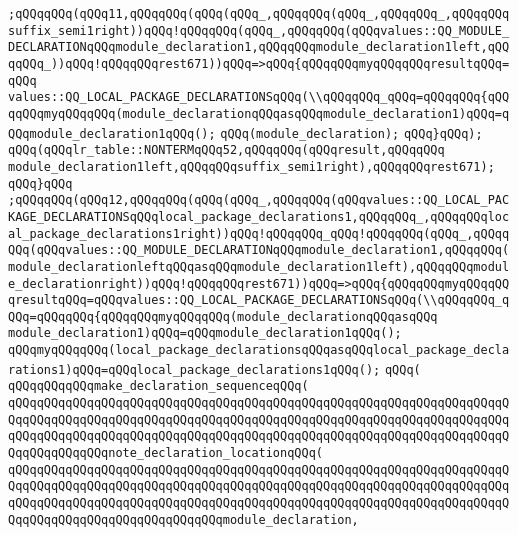 \verb|;qQQqqQQq(qQQq11,qQQqqQQq(qQQq(qQQq_,qQQqqQQq(qQQq_,qQQqqQQq_,qQQqqQQqsuffix_semi1right))qQQq!qQQqqQQq(qQQq_,qQQqqQQq(qQQqvalues::QQ_MODULE_DECLARATIONqQQqmodule_declaration1,qQQqqQQqmodule_declaration1left,qQQqqQQq_))qQQq!qQQqqQQqrest671))qQQq=>qQQq{qQQqqQQqmyqQQqqQQqresultqQQq=qQQq|\newline
\verb|values::QQ_LOCAL_PACKAGE_DECLARATIONSqQQq(\\qQQqqQQq_qQQq=qQQqqQQq{qQQqqQQqmyqQQqqQQq(module_declarationqQQqasqQQqmodule_declaration1)qQQq=qQQqmodule_declaration1qQQq();|\newline
\verb|qQQq(module_declaration);|\newline
\verb|qQQq}qQQq);|\newline
\verb|qQQq(qQQqlr_table::NONTERMqQQq52,qQQqqQQq(qQQqresult,qQQqqQQq|\newline
\verb|module_declaration1left,qQQqqQQqsuffix_semi1right),qQQqqQQqrest671);|\newline
\verb|qQQq}qQQq|\newline
\verb|;qQQqqQQq(qQQq12,qQQqqQQq(qQQq(qQQq_,qQQqqQQq(qQQqvalues::QQ_LOCAL_PACKAGE_DECLARATIONSqQQqlocal_package_declarations1,qQQqqQQq_,qQQqqQQqlocal_package_declarations1right))qQQq!qQQqqQQq_qQQq!qQQqqQQq(qQQq_,qQQqqQQq(qQQqvalues::QQ_MODULE_DECLARATIONqQQqmodule_declaration1,qQQqqQQq(|\newline
\verb|module_declarationleftqQQqasqQQqmodule_declaration1left),qQQqqQQqmodule_declarationright))qQQq!qQQqqQQqrest671))qQQq=>qQQq{qQQqqQQqmyqQQqqQQqresultqQQq=qQQqvalues::QQ_LOCAL_PACKAGE_DECLARATIONSqQQq(\\qQQqqQQq_qQQq=qQQqqQQq{qQQqqQQqmyqQQqqQQq(module_declarationqQQqasqQQq|\newline
\verb|module_declaration1)qQQq=qQQqmodule_declaration1qQQq();|\newline
\verb|qQQqmyqQQqqQQq(local_package_declarationsqQQqasqQQqlocal_package_declarations1)qQQq=qQQqlocal_package_declarations1qQQq();|\newline
\verb|qQQq(|\newline
\verb|qQQqqQQqqQQqmake_declaration_sequenceqQQq(|\newline
\verb|qQQqqQQqqQQqqQQqqQQqqQQqqQQqqQQqqQQqqQQqqQQqqQQqqQQqqQQqqQQqqQQqqQQqqQQqqQQqqQQqqQQqqQQqqQQqqQQqqQQqqQQqqQQqqQQqqQQqqQQqqQQqqQQqqQQqqQQqqQQqqQQqqQQqqQQqqQQqqQQqqQQqqQQqqQQqqQQqqQQqqQQqqQQqqQQqqQQqqQQqqQQqqQQqqQQqqQQqqQQqqQQqnote_declaration_locationqQQq(|\newline
\verb|qQQqqQQqqQQqqQQqqQQqqQQqqQQqqQQqqQQqqQQqqQQqqQQqqQQqqQQqqQQqqQQqqQQqqQQqqQQqqQQqqQQqqQQqqQQqqQQqqQQqqQQqqQQqqQQqqQQqqQQqqQQqqQQqqQQqqQQqqQQqqQQqqQQqqQQqqQQqqQQqqQQqqQQqqQQqqQQqqQQqqQQqqQQqqQQqqQQqqQQqqQQqqQQqqQQqqQQqqQQqqQQqqQQqqQQqqQQqqQQqmodule_declaration,|\newline
